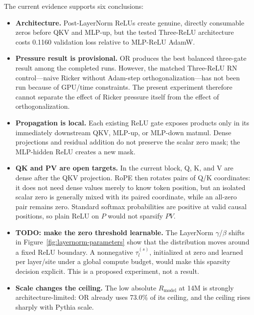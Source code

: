 \documentclass[10pt]{article}
\newcommand{\pct}{\%}
\begin{document}
The current evidence supports six conclusions:
\begin{itemize}[leftmargin=1.3em]
  \item \textbf{Architecture.} Post-LayerNorm ReLUs create genuine, directly consumable zeros before QKV and MLP-up, but the tested Three-ReLU architecture costs 0.1160 validation loss relative to MLP-ReLU AdamW.
  \item \textbf{Pressure result is provisional.} OR produces the best balanced three-gate result among the completed runs. However, the matched Three-ReLU RN control---naive Ricker without Adam-step orthogonalization---has not been run because of GPU/time constraints. The present experiment therefore cannot separate the effect of Ricker pressure itself from the effect of orthogonalization.
  \item \textbf{Propagation is local.} Each existing ReLU gate exposes products only in its immediately downstream QKV, MLP-up, or MLP-down matmul. Dense projections and residual addition do not preserve the scalar zero mask; the MLP-hidden ReLU creates a new mask.
  \item \textbf{QK and PV are open targets.} In the current block, Q, K, and V are dense after the QKV projection. RoPE then rotates pairs of Q/K coordinates: it does not need dense values merely to know token position, but an isolated scalar zero is generally mixed with its paired coordinate, while an all-zero pair remains zero. Standard softmax probabilities are positive at valid causal positions, so plain ReLU on $P$ would not sparsify $PV$.
  \item \textbf{TODO: make the zero threshold learnable.} The LayerNorm $\gamma$/$\beta$ shifts in Figure~\ref{fig:layernorm-parameters} show that the distribution moves around a fixed ReLU boundary. A nonnegative $\tau_l^{(s)}$, initialized at zero and learned per layer/site under a global compute budget, would make this sparsity decision explicit. This is a proposed experiment, not a result.
  \item \textbf{Scale changes the ceiling.} The low absolute $R_{\mathrm{model}}$ at 14M is strongly architecture-limited: OR already uses 73.0\pct{} of its ceiling, and the ceiling rises sharply with Pythia scale.
\end{itemize}
\end{document}
